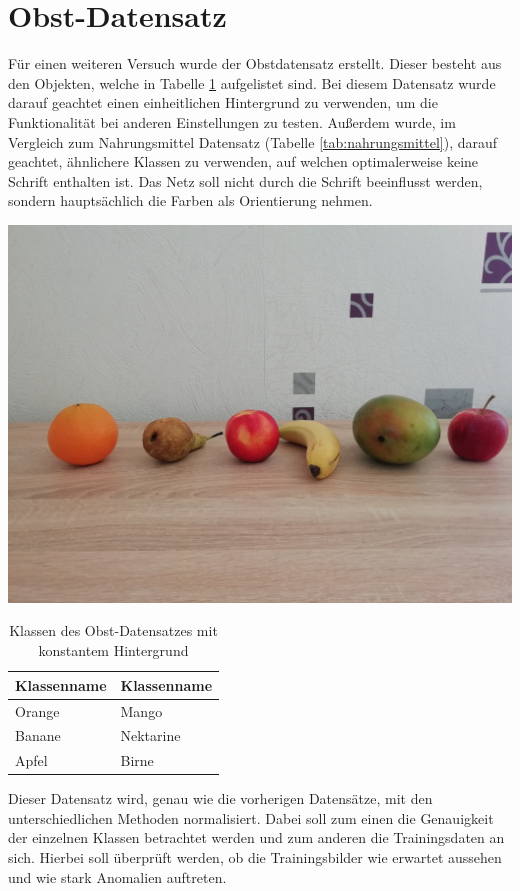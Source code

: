 \section{Obst-Datensatz}
Für einen weiteren Versuch wurde der Obstdatensatz erstellt. Dieser besteht aus den Objekten, welche in Tabelle \ref{tab:obst} aufgelistet sind. Bei diesem Datensatz wurde darauf geachtet einen einheitlichen Hintergrund zu verwenden, um die Funktionalität bei anderen Einstellungen zu testen. Außerdem wurde, im Vergleich zum Nahrungsmittel Datensatz (Tabelle \ref{tab:nahrungsmittel}), darauf geachtet, ähnlichere Klassen zu verwenden, auf welchen optimalerweise keine Schrift enthalten ist. Das Netz soll nicht durch die Schrift beeinflusst werden, sondern hauptsächlich die Farben als Orientierung nehmen.
\begin{table}[htb]
\caption{Klassen des Obst-Datensatzes mit konstantem Hintergrund}
\center
\begin{minipage}[c]{.4\textwidth} 
\includegraphics[width=.8\textwidth]{Sources/Obst_mit_hintergrund}  
\end{minipage} 
\begin{minipage}[c]{.4\textwidth}\label{tab:obst}   
\begin{tabular}{|l|l|}
\hline
Klassenname & Klassenname\\
\hline
Orange & Mango\\
Banane & Nektarine\\
Apfel & Birne\\
\hline
\end{tabular} 
\end{minipage}
\end{table}  
Dieser Datensatz wird, genau wie die vorherigen Datensätze, mit den unterschiedlichen Methoden normalisiert. Dabei soll zum einen die Genauigkeit der einzelnen Klassen betrachtet werden und zum anderen die Trainingsdaten an sich. Hierbei soll überprüft werden, ob die Trainingsbilder wie erwartet aussehen und wie stark Anomalien auftreten. 
